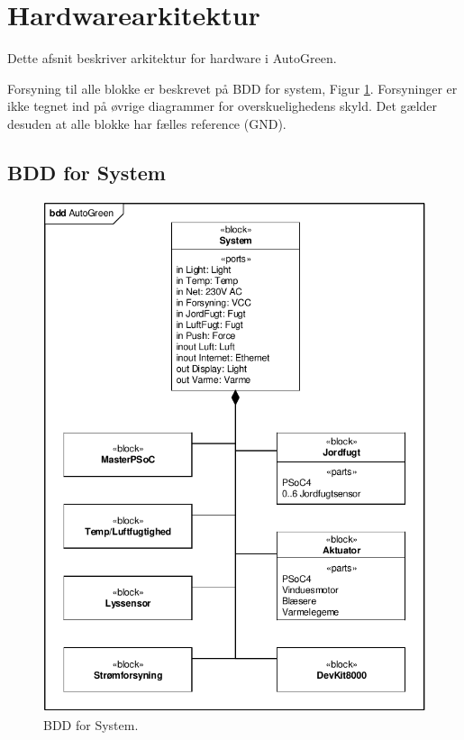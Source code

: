 \section{Hardwarearkitektur}
Dette afsnit beskriver arkitektur for hardware i AutoGreen.

Forsyning til alle blokke er beskrevet på BDD for system, Figur \ref{fig:bdd_system}. Forsyninger er ikke tegnet ind på øvrige diagrammer for overskuelighedens skyld. Det gælder desuden at alle blokke har fælles reference (GND). 

\clearpage

\subsection{BDD for System}
\begin{figure}[h]
\centering 
\includegraphics[width={\textwidth-2cm}, trim=0 0 0 0, clip=true] {../fig/bdd_system.pdf}
\caption{BDD for System.}
\label{fig:bdd_system}
\end{figure}
\clearpage

